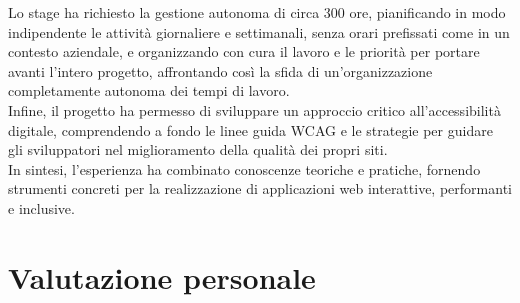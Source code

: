 Lo stage ha richiesto la gestione autonoma di circa 300 ore, pianificando in modo indipendente le attività giornaliere e settimanali, senza orari prefissati come in un contesto aziendale, e organizzando con cura il lavoro e le priorità per portare avanti l’intero progetto, affrontando così la sfida di un’organizzazione completamente autonoma dei tempi di lavoro.\\
Infine, il progetto ha permesso di sviluppare un approccio critico all’accessibilità digitale, comprendendo a fondo le linee guida WCAG e le strategie per guidare gli sviluppatori nel miglioramento della qualità dei propri siti. 
\\In sintesi, l’esperienza ha combinato conoscenze teoriche e pratiche, fornendo strumenti concreti per la realizzazione di applicazioni web interattive, performanti e inclusive.

\section{Valutazione personale}